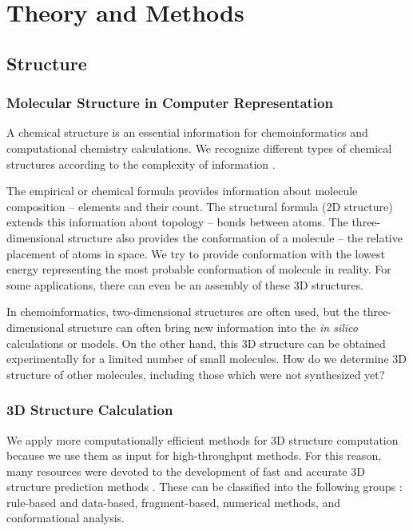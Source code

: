 \part{Theory and Methods}
\label{part:theory}

\chapter{Structure}

\section{Molecular Structure in Computer Representation}

A chemical structure is an essential information for chemoinformatics and
computational chemistry calculations. We recognize different types of chemical
structures according to the complexity of information \cite{Gasteiger2006}. 

The empirical or chemical formula provides information about molecule
composition -- elements and their count. The structural formula (2D structure)
extends this information about topology -- bonds between atoms. The
three-dimensional structure also provides the conformation of a molecule -- the
relative placement of atoms in space. We try to provide conformation with the
lowest energy representing the most probable conformation of molecule
in reality. For some applications, there can even be an assembly of
these 3D structures.

In chemoinformatics, two-dimensional structures are often used, but the
three-di\-men\-sio\-nal structure can often bring new information into the
\textit{in silico} calculations or models. On the other hand, this 3D structure
can be obtained experimentally for a limited number of small molecules. How do
we determine 3D structure of other molecules, including those which were not
synthesized yet?

\section{3D Structure Calculation}

We apply more computationally efficient methods for 3D structure computation
because we use them as input for high-throughput methods. For this reason, many
resources were devoted to the development of fast and accurate 3D structure
prediction methods \cite{Sadowski2008}. These can be classified into the following
groups \cite{Sadowski2008}: rule-based and data-based, fragment-based, numerical methods, and
conformational analysis.

